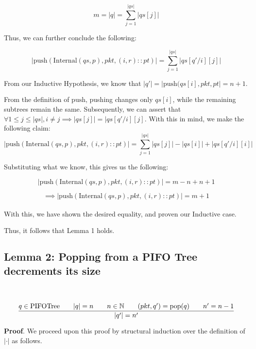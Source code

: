 \documentclass{article}
\begin{document}
$$m = |q| = \sum_{j=1}^{|qs|} |qs[j]|$$

\noindent Thus, we can further conclude the following:

$$|\text{push}(\text{Internal}(qs, p), pkt, (i, r) :: pt)| = \sum_{j=1}^{|qs|} |qs[q'/i][j]|$$

\noindent From our Inductive Hypothesis, we know that $|q'| = |\text{push}(qs[i], pkt, pt| = n+1$.\newline

\noindent From the definition of $\text{push}$, pushing changes only $qs[i]$, while the remaining subtrees remain the same. Subsequently, we can assert that $\forall 
1 \leq j \leq |qs|, i \neq j \implies |qs[j]| = |qs[q'/i][j]$. With this in mind, we make the following claim:\\[-15pt]

$$|\text{push}(\text{Internal}(qs, p), pkt, (i, r) :: pt)| = \sum_{j=1}^{|qs|} |qs[j]| - |qs[i]| + |qs[q'/i][i]|$$

\noindent Substituting what we know, this gives us the following:

$$|\text{push}(\text{Internal}(qs, p), pkt, (i, r) :: pt)| = m - n + n + 1$$

$$\implies |\text{push}(\text{Internal}(qs, p), pkt, (i, r) :: pt)| = m + 1$$\\[-15pt]

\noindent With this, we have shown the desired equality, and proven our Inductive case.\newline

\noindent Thus, it follows that Lemma 1 holds.\newline

\subsection{Lemma 2: Popping from a PIFO Tree decrements its size}

\par\

$$\frac{q \in \text{PIFOTree} \hspace{0.7cm} |q| = n \hspace{0.7cm} n \in \mathbb{N} \hspace{0.7cm} (pkt, q') = \text{pop}(q) \hspace{0.7cm} n' = n-1}{|q'| = n'}$$

\noindent \textbf{Proof}. We proceed upon this proof by structural induction over the definition of $|\cdot|$ as follows.\newline
\end{document}
